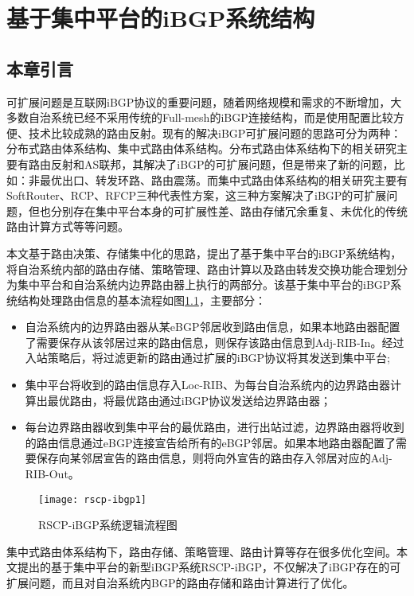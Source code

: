 \chapter{基于集中平台的iBGP系统结构}
\label{cha:architecture}


\section{本章引言}
可扩展问题是互联网iBGP协议的重要问题，随着网络规模和需求的不断增加，大多数自治系统已经不采用传统的Full-mesh的iBGP连接结构，而是使用配置比较方便、技术比较成熟的路由反射。现有的解决iBGP可扩展问题的思路可分为两种：分布式路由体系结构、集中式路由体系结构。分布式路由体系结构下的相关研究主要有路由反射和AS联邦，其解决了iBGP的可扩展问题，但是带来了新的问题，比如：非最优出口、转发环路、路由震荡。而集中式路由体系结构的相关研究主要有SoftRouter、RCP、RFCP三种代表性方案，这三种方案解决了iBGP的可扩展问题，但也分别存在集中平台本身的可扩展性差、路由存储冗余重复、未优化的传统路由计算方式等等问题。

本文基于路由决策、存储集中化的思路，提出了基于集中平台的iBGP系统结构，将自治系统内部的路由存储、策略管理、路由计算以及路由转发交换功能合理划分为集中平台和自治系统内边界路由器上执行的两部分。该基于集中平台的iBGP系统结构处理路由信息的基本流程如图\ref{fig:rscp-ibgp1}，主要部分：
\begin{itemize}
  \item 自治系统内的边界路由器从某eBGP邻居收到路由信息，如果本地路由器配置了需要保存从该邻居过来的路由信息，则保存该路由信息到Adj-RIB-In。经过入站策略后，将过滤更新的路由通过扩展的iBGP协议将其发送到集中平台;
  \item 集中平台将收到的路由信息存入Loc-RIB、为每台自治系统内的边界路由器计算出最优路由，将最优路由通过iBGP协议发送给边界路由器；
  \item 每台边界路由器收到集中平台的最优路由，进行出站过滤，边界路由器将收到的路由信息通过eBGP连接宣告给所有的eBGP邻居。如果本地路由器配置了需要保存向某邻居宣告的路由信息，则将向外宣告的路由存入邻居对应的Adj-RIB-Out。
\end{itemize}

\begin{figure}
  \centering
  \texttt{[image: rscp-ibgp1]}
  \caption{RSCP-iBGP系统逻辑流程图}
  \label{fig:rscp-ibgp1}
\end{figure}

集中式路由体系结构下，路由存储、策略管理、路由计算等存在很多优化空间。本文提出的基于集中平台的新型iBGP系统RSCP-iBGP，不仅解决了iBGP存在的可扩展问题，而且对自治系统内BGP的路由存储和路由计算进行了优化。


